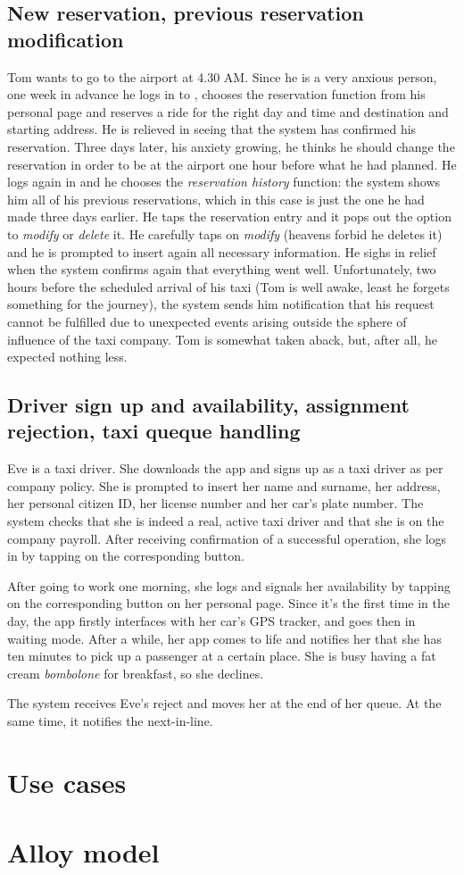 \subsection{New reservation,  previous reservation modification}
Tom wants to go to the airport at 4.30 AM. Since he is a very anxious person, one week in advance he logs in to \mts{}, chooses the reservation function from his personal page and reserves a ride for the right day and time and destination and starting address. He is relieved in seeing that the system has confirmed his reservation.
Three days later, his anxiety growing, he thinks he should change the reservation in order to be at the airport one hour before what he had planned. He logs again in \mts{} and he chooses the \emph{reservation history} function: the system shows him all of his previous reservations, which in this case is just the one he had made three days earlier. He taps the reservation entry and it pops out the option to \emph{modify} or \emph{delete} it. He carefully taps on \emph{modify} (heavens forbid he deletes it) and he is prompted to insert again all necessary information. He sighs in relief when the system confirms again that everything went well.
Unfortunately, two hours before the scheduled arrival of his taxi (Tom is well awake, least he forgets something for the journey), the system sends him notification that his request cannot be fulfilled due to unexpected events arising outside the sphere of influence of the taxi company. Tom is somewhat taken aback, but, after all, he expected nothing less.

\subsection{Driver sign up and availability, assignment rejection, taxi queque handling}
Eve is a taxi driver. She downloads the \mts{} app and signs up as a taxi driver as per company policy. She is prompted to insert her name and surname, her address, her personal citizen ID, her license number and her car's plate number. The system checks that she is indeed a real, active taxi driver and that she is on the company payroll. After receiving confirmation of a successful operation, she logs in by tapping on the corresponding button.

After going to work one morning, she logs and signals her availability by tapping on the corresponding button on her personal page. Since it's the first time in the day, the app firstly interfaces with her car's GPS tracker, and goes then in waiting mode. After a while, her app comes to life and notifies her that she has ten minutes to pick up a passenger at a certain place. She is busy having a fat cream \emph{bombolone} for breakfast, so she declines.

The system receives Eve's reject and moves her at the end of her queue. At the same time, it notifies the next-in-line.

\section{Use cases}

\section{Alloy model}